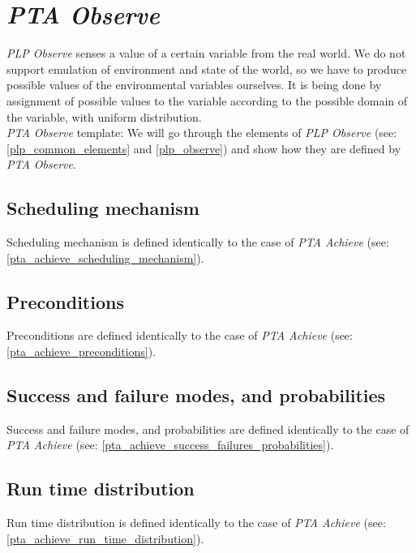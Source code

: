 \section{\textit{PTA Observe}}
\textit{PLP Observe} senses a value of a certain variable from the real world. We do not support emulation of environment and state of the world, so we have to produce possible values of the environmental variables ourselves. It is being done by assignment of possible values to the variable according to the possible domain of the variable, with uniform distribution. \\
\textit{PTA Observe} template:   We will go through the elements of \textit{PLP Observe} (see: \ref{plp_common_elements} and \ref{plp_observe}) and show how they are defined by \textit{PTA Observe}.\\
\subsection{Scheduling mechanism}
Scheduling mechanism is defined identically to the case of \textit{PTA Achieve}  (see: \ref{pta_achieve_scheduling_mechanism}).\\
\subsection{Preconditions}
Preconditions are defined identically to the case of \textit{PTA Achieve}  (see: \ref{pta_achieve_preconditions}).\\
\subsection{Success and failure modes, and probabilities }
Success and failure modes, and probabilities are defined identically to the case of \textit{PTA Achieve}  (see: \ref{pta_achieve_success_failures_probabilities}).\\
\subsection{Run time distribution}
Run time distribution is defined identically to the case of \textit{PTA Achieve}  (see: \ref{pta_achieve_run_time_distribution}).\\
